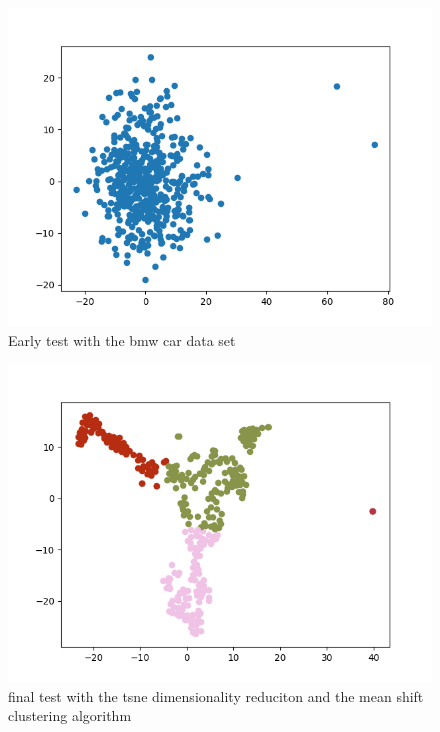 \documentclass[journal]{vgtc}       %
\begin{document}

\begin{figure}[tb]
	\begin{center}
		\includegraphics[width=.75\linewidth]{Figure2.png}
	\end{center}
	\caption{\label{fig:bmw} Early test with the bmw car data set }
\end{figure}
\begin{figure}[tb]
	\begin{center}
		\includegraphics[width=.75\linewidth]{MS-tsne.png}
	\end{center}
	\caption{\label{fig:tsne} final test with the tsne dimensionality reduciton and the mean shift clustering algorithm }
\end{figure}
\end{document}
